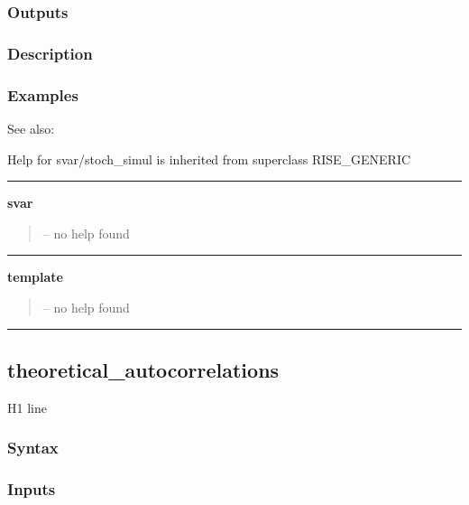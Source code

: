 \documentclass[letterpaper,10pt,english]{sphinxmanual}
\begin{document}
\subsubsection{Outputs}
\label{classes/models/@svar/svar:id136}

\subsubsection{Description}
\label{classes/models/@svar/svar:id137}

\subsubsection{Examples}
\label{classes/models/@svar/svar:id138}
See also:

Help for svar/stoch\_simul is inherited from superclass RISE\_GENERIC


\bigskip\hrule{}\bigskip

\label{classes/models/@svar/svar:svar}
\textbf{svar}
\begin{quote}

-- no help found
\end{quote}


\bigskip\hrule{}\bigskip

\label{classes/models/@svar/svar:template}
\textbf{template}
\begin{quote}

-- no help found
\end{quote}


\bigskip\hrule{}\bigskip



\subsection{theoretical\_autocorrelations}
\label{classes/models/@svar/svar:theoretical-autocorrelations}\label{classes/models/@svar/svar:id139}
H1 line


\subsubsection{Syntax}
\label{classes/models/@svar/svar:id140}

\subsubsection{Inputs}
\label{classes/models/@svar/svar:id141}
\end{document}
